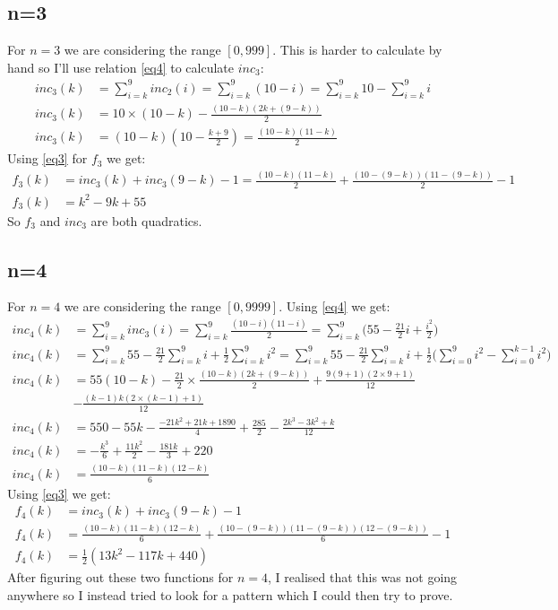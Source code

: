 \documentclass[titlepage,12pt]{article}
\begin{document}
\subsection{n=3}
For $n=3$ we are considering the range $[0, 999]$. This is harder to calculate by hand so I'll use relation \ref{eq4} to calculate $inc_3$:
\begin{align*}
    inc_3(k) &= \sum_{i=k}^{9} inc_2(i) = \sum_{i=k}^{9} (10-i) = \sum_{i=k}^{9} 10 - \sum_{i=k}^{9} i\\
    inc_3(k) &= 10 \times (10-k) - \frac{(10-k)(2k+(9-k))}{2}\\
    inc_3(k) &= (10-k)(10-\frac{k+9}{2}) = \frac{(10-k)(11-k)}{2}
\end{align*}
Using \ref{eq3} for $f_3$ we get:
\begin{align*}
    f_3(k) &= inc_3(k) + inc_3(9-k) - 1 = \frac{(10-k)(11-k)}{2} + \frac{(10-(9-k))(11-(9-k))}{2} - 1\\
    f_3(k) &= k^2 - 9k + 55
\end{align*}
So $f_3$ and $inc_3$ are both quadratics.

\subsection{n=4}
For $n=4$ we are considering the range $[0, 9999]$. Using \ref{eq4} we get:
\begin{equation*}
    \begin{split}
        inc_4(k) &= \sum_{i=k}^{9} inc_3(i) = \sum_{i=k}^{9} \frac{(10-i)(11-i)}{2} = \sum_{i=k}^{9} \Bigg(55-\frac{21}{2}i+\frac{i^2}{2}\Bigg)\\
        inc_4(k) &= \sum_{i=k}^{9} 55 - \frac{21}{2}\sum_{i=k}^{9}i + \frac{1}{2}\sum_{i=k}^{9}i^2 = \sum_{i=k}^{9} 55 - \frac{21}{2}\sum_{i=k}^{9}i + \frac{1}{2}\Bigg(\sum_{i=0}^{9}i^2 - \sum_{i=0}^{k-1}i^2\Bigg)\\
        inc_4(k) &= 55(10-k) - \frac{21}{2} \times \frac{(10-k)(2k+(9-k))}{2} + \frac{9(9+1)(2 \times 9 + 1)}{12} \\
        &- \frac{(k-1)k(2 \times (k-1) + 1)}{12}\\
        inc_4(k) &= 550-55k - \frac{-21k^2+21k+1890}{4} + \frac{285}{2} - \frac{2k^3  - 3k^2 + k}{12}\\
        inc_4(k) &= -\frac{k^3}{6} + \frac{11k^2}{2} - \frac{181k}{3} + 220\\
        inc_4(k) &= \frac{(10-k)(11-k)(12-k)}{6}
    \end{split}
\end{equation*}
Using \ref{eq3} we get:
\begin{align*}
    f_4(k) &= inc_3(k) + inc_3(9-k) - 1\\
    f_4(k) &= \frac{(10-k)(11-k)(12-k)}{6} + \frac{(10-(9-k))(11-(9-k))(12-(9-k))}{6} - 1\\
    f_4(k) &= \frac{1}{2}(13k^2 - 117k + 440)
\end{align*}
\noindent
After figuring out these two functions for $n=4$, I realised that this was not going anywhere so I instead tried to look for a pattern which I could then try to prove.
\end{document}

